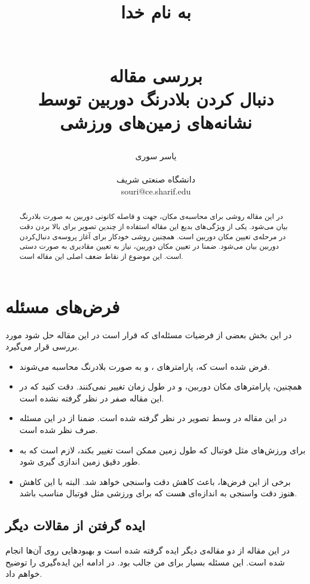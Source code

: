 \documentclass{report}
\title{
\begin{normalsize}
به نام خدا
\end{normalsize}
\\[2cm]
بررسی مقاله
\\[1cm]
دنبال کردن بلادرنگ دوربین توسط نشانه‌های زمین‌های ورزشی
}
\author{یاسر سوری
\\
\\ \small دانشگاه صنعتی شریف
\\ \small souri@ce.sharif.edu
}
\begin{document}
\maketitle

\begin{abstract}
در این مقاله روشی برای محاسبه‌ی مکان، جهت و فاصله کانونی دوربین به صورت بلادرنگ بیان می‌شود. یکی از ویژگی‌های بدیع این مقاله استفاده از چندین تصویر برای بالا بردن دقت در مرحله‌ی تعیین مکان دوربین است. همچنین روشی خودکار برای آغاز پروسه‌ی دنبال‌کردن دوربین بیان می‌شود.
ضمنا در تعیین مکان دوربین، نیاز به تعیین مقادیری به صورت دستی است. این موضوع از نقاط ضعف اصلی این مقاله است.

\end{abstract}

\section{فرض‌های مسئله}
در این بخش بعضی از فرضیات مسئله‌ای که قرار است در این مقاله حل شود مورد بررسی قرار می‌گیرد.
\begin{itemize}
\item
فرض شده است که، پارامتر‌های ،  و  به صورت بلادرنگ محاسبه می‌شوند.
\item
همچنین، پارامترهای مکان دوربین،  و  در طول زمان تغییر نمی‌کنند. دقت کنید که در این مقاله  صفر در نظر گرفته نشده است.
\item
در این مقاله  در وسط تصویر در نظر گرفته شده است. ضمنا از  در این مسئله صرف نظر شده است.
\item
برای ورزش‌های مثل فوتبال که طول زمین ممکن است تغییر بکند، لازم است که به طور دقیق زمین اندازی گیری شود.
\item
برخی از این فرض‌ها، باعث کاهش دقت واسنجی خواهد شد. البته با این کاهش هنوز دقت واسنجی به اندازه‌ای هست که برای ورزشی مثل فوتبال مناسب باشد.
\end{itemize}
\subsection{ایده گرفتن از مقالات دیگر}
در این مقاله از دو مقاله‌ی دیگر ایده گرفته شده است و بهبود‌هایی روی آن‌ها انجام شده است. این مسئله بسیار برای من جالب بود. در ادامه این ایده‌گیری را توضیح خواهم داد.
\end{document}
